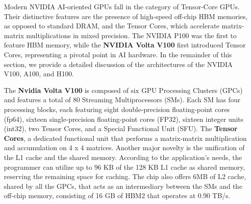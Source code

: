 Modern NVIDIA AI-oriented GPUs fall in the category of Tensor-Core GPUs. Their distinctive features are the presence of high-speed off-chip HBM memories, as opposed to standard DRAM, and the Tensor Cores, which accelerate matrix-matrix multiplications in mixed precision.
The NVIDIA P100 was the first to feature HBM memory, while the \textbf{NVIDIA Volta V100} \cite{choquette2018volta} first introduced Tensor Cores, representing a pivotal point in AI hardware.
In the remainder of this section, we provide a detailed discussion of the architectures of the NVIDIA V100, A100, and H100.

The \textbf{Nvidia Volta V100} is composed of six GPU Processing Clusters (GPCs) and features a total of 80 Streaming Multiprocessors (SMs). Each SM has four processing blocks, each featuring eight double-precision floating-point cores (fp64), sixteen single-precision floating-point cores (FP32), sixteen integer units (int32), two Tensor Cores, and a Special Functional Unit (SFU). The \textbf{Tensor Cores}, a dedicated functional unit that performs a matrix-matrix multiplication and accumulation on 4 x 4 matrices.
Another major novelty is the unification of the L1 cache and the shared memory. According to the application's needs, the programmer can utilize up to 96 KB of the 128 KB L1 cache as shared memory, reserving the remaining space for caching.
The chip also offers 6MB of L2 cache, shared by all the GPCs, that acts as an intermediary between the SMs and the off-chip memory, consisting of 16 GB of HBM2 that operates at 0.90 TB/s.

